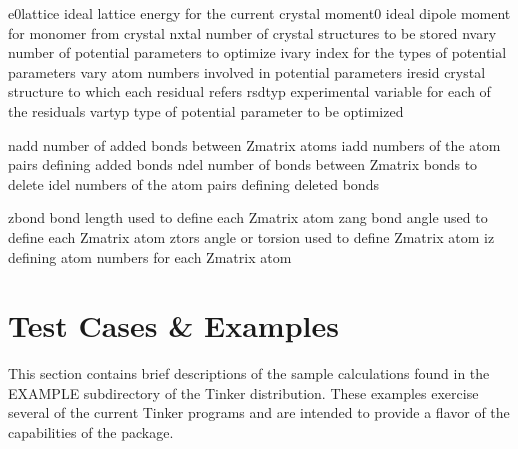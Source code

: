 \documentclass[letterpaper,11pt,english]{sphinxmanual}
\begin{document}

\begin{sphinxVerbatim}[commandchars=\\\{\}]
e0\PYGZus{}lattice      ideal lattice energy for the current crystal
moment\PYGZus{}0        ideal dipole moment for monomer from crystal
nxtal           number of crystal structures to be stored
nvary           number of potential parameters to optimize
ivary           index for the types of potential parameters
vary            atom numbers involved in potential parameters
iresid          crystal structure to which each residual refers
rsdtyp          experimental variable for each of the residuals
vartyp          type of potential parameter to be optimized
\end{sphinxVerbatim}


\begin{sphinxVerbatim}[commandchars=\\\{\}]
nadd            number of added bonds between Z\PYGZhy{}matrix atoms
iadd            numbers of the atom pairs defining added bonds
ndel            number of bonds between Z\PYGZhy{}matrix bonds to delete
idel            numbers of the atom pairs defining deleted bonds
\end{sphinxVerbatim}


\begin{sphinxVerbatim}[commandchars=\\\{\}]
zbond           bond length used to define each Z\PYGZhy{}matrix atom
zang            bond angle used to define each Z\PYGZhy{}matrix atom
ztors           angle or torsion used to define Z\PYGZhy{}matrix atom
iz              defining atom numbers for each Z\PYGZhy{}matrix atom
\end{sphinxVerbatim}


\chapter{Test Cases \& Examples}
\label{\detokenize{text/test-cases:test-cases-examples}}\label{\detokenize{text/test-cases::doc}}
This section contains brief descriptions of the sample calculations found in the EXAMPLE subdirectory of the Tinker distribution. These examples exercise several of the current Tinker programs and are intended to provide a flavor of the capabilities of the package.
\end{document}
